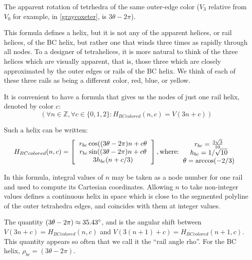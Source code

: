 \documentclass[11pt]{article}
\begin{document}
The apparent rotation of tetrhedra of the same outer-edge color ($V_3$ relative from $V_0$ for example,
in \eqref{graycoxeter}, is $3 \theta - 2\pi$).

This formula defines a helix, but it is not any of the apparent helices, or rail helices, of the
BC helix, but rather one that winds three times as rapidly through all
nodes. To a designer of tetrahelices, it is more natural to think of
the three helices which are visually apparent, that is, those three
which are closely approximated by the outer edges or rails of
the BC helix. We think of each of these three rails as being a different color, red, blue, or yellow.

It is convenient to have a formula that gives us the nodes of just
one rail helix, denoted by color $c$:
\[
(\forall n \in \mathbb{Z}, \forall c \in \{0,1,2\} : H_{BCcolored}(n,c) = V(3n +c))
\]

Such a helix can be written:
\begin{equation}
  \label{eq:colord}
H_{BCcolored}(n,c) =
\left [
  \begin{tabular}{c}
   $ r_{bc}  \cos((3 \theta - 2 \pi)n + c  \theta $\\
   $ r_{bc} \sin((3 \theta - 2 \pi)n + c  \theta $\\
   $ 3 h_{bc} (n + c/3)  $
  \end{tabular}
  \right ],
\text{where:}
  \begin{tabular}{c}
 $ r_{bc} = \frac{3\sqrt{3}}{10} $\\
 $ h_{bc} = 1/\sqrt{10} $ \\
 $ \theta = \arccos(-2/3) $ \\
  \end{tabular}      
\end{equation}

In this formula, integral values of $n$ may be taken as a node number for one rail and used to compute its Cartesian
coordinates. Allowing $n$ to take non-integer values defines a continuous
helix in space which is close to the segmented polyline of the outer tetrahedra edges, and coincides with them at integer
values.

The quantity $ (3 \theta - 2 \pi) \approx 35.43 \degree $, and is the angular shift between $V(3n+c)=H_{BCcolored}(n,c)$ and
$V(3(n+1)+c)=H_{BCcolored}(n+1,c)$.
This quantity appears so often that we call it the ``rail angle rho''. For the BC helix, $\rho_{bc} = (3 \theta - 2 \pi)$.
\end{document}
